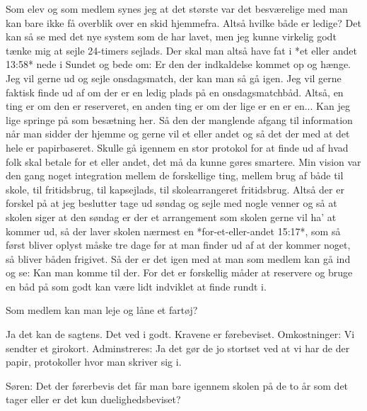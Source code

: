 Som elev og som medlem synes jeg at det største var det besværelige med man kan bare ikke få overblik over en skid hjemmefra. Altså hvilke både er ledige? Det kan så se med det nye system som de har lavet, men jeg kunne virkelig godt tænke mig at sejle 24-timers sejlads. Der skal man altså have fat i *et eller andet 13:58* nede i Sundet og bede om: Er den der indkaldelse kommet op og hænge. Jeg vil gerne ud og sejle onsdagsmatch, der kan man så gå igen. Jeg vil gerne faktisk finde ud af om der er en ledig plads på en onsdagsmatchbåd. Altså, en ting er om den er reserveret, en anden ting er om der lige er en er en... Kan jeg lige springe på som besætning her. Så den der manglende afgang til information når man sidder der hjemme og gerne vil et eller andet og så det der med at det hele er papirbaseret. Skulle gå igennem en stor protokol for at finde ud af hvad folk skal betale for et eller andet, det må da kunne gøres smartere. Min vision var den gang noget integration mellem de forskellige ting, mellem brug af både til skole, til fritidsbrug, til kapsejlads, til skolearrangeret fritidsbrug. Altså der er forskel på at jeg beslutter tage ud søndag og sejle med nogle venner og så at skolen siger at den søndag er der et arrangement som skolen gerne vil ha' at kommer ud, så der laver skolen nærmest en *for-et-eller-andet 15:17*, som så først bliver oplyst måske tre dage før at man finder ud af at der kommer noget, så bliver båden frigivet. Så der er det igen med at man som medlem kan gå ind og se: Kan man komme til der. For det er forskellig måder at reservere og bruge en båd på som godt kan være lidt indviklet at finde rundt i. 

Som medlem kan man leje og låne et fartøj?

Ja det kan de sagtens. Det ved i godt. Kravene er førebeviset. Omkostninger: Vi sendter et girokort. Adminstreres: Ja det gør de jo stortset ved at vi har de der papir, protokoller hvor man skriver sig i. 

Søren: Det der førerbevis det får man bare igennem skolen på de to år som det tager eller er det kun duelighedsbeviset?

